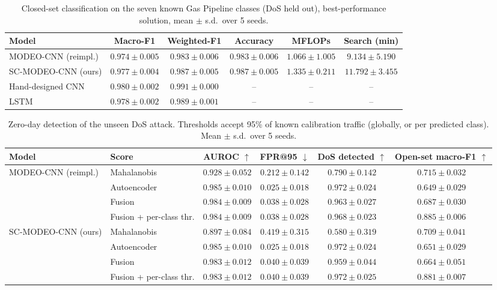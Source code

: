 \documentclass[10pt,twocolumn,letterpaper]{article}
\begin{document}
\begin{table}[t]\centering\small
\caption{Closed-set classification on the seven known Gas Pipeline classes (DoS held out), best-performance solution, mean $\pm$ s.d.\ over 5 seeds.}\label{tab:closed}
\begin{tabular}{lccccc}\toprule
Model & Macro-F1 & Weighted-F1 & Accuracy & MFLOPs & Search (min)\\\midrule
MODEO-CNN (reimpl.) & $0.974 \pm 0.005$ & $0.983 \pm 0.006$ & $0.983 \pm 0.006$ & $1.066 \pm 1.005$ & $9.134 \pm 5.190$\\
SC-MODEO-CNN (ours) & $0.977 \pm 0.004$ & $0.987 \pm 0.005$ & $0.987 \pm 0.005$ & $1.335 \pm 0.211$ & $11.792 \pm 3.455$\\
Hand-designed CNN & $0.980 \pm 0.002$ & $0.991 \pm 0.000$ & -- & -- & --\\
LSTM & $0.978 \pm 0.002$ & $0.989 \pm 0.001$ & -- & -- & --\\\bottomrule
\end{tabular}
\end{table}

\begin{table}[t]\centering\small
\caption{Zero-day detection of the unseen DoS attack. Thresholds accept 95\% of known calibration traffic (globally, or per predicted class). Mean $\pm$ s.d.\ over 5 seeds.}\label{tab:zeroday}
\begin{tabular}{llcccc}\toprule
Model & Score & AUROC $\uparrow$ & FPR@95 $\downarrow$ & DoS detected $\uparrow$ & Open-set macro-F1 $\uparrow$\\\midrule
\multirow{4}{*}{MODEO-CNN (reimpl.)} & Mahalanobis & $0.928 \pm 0.052$ & $0.212 \pm 0.142$ & $0.790 \pm 0.142$ & $0.715 \pm 0.032$\\
 & Autoencoder & $0.985 \pm 0.010$ & $0.025 \pm 0.018$ & $0.972 \pm 0.024$ & $0.649 \pm 0.029$\\
 & Fusion & $0.984 \pm 0.009$ & $0.038 \pm 0.028$ & $0.963 \pm 0.027$ & $0.687 \pm 0.030$\\
 & Fusion + per-class thr. & $0.984 \pm 0.009$ & $0.038 \pm 0.028$ & $0.968 \pm 0.023$ & $0.885 \pm 0.006$\\\midrule
\multirow{4}{*}{SC-MODEO-CNN (ours)} & Mahalanobis & $0.897 \pm 0.084$ & $0.419 \pm 0.315$ & $0.580 \pm 0.319$ & $0.709 \pm 0.041$\\
 & Autoencoder & $0.985 \pm 0.010$ & $0.025 \pm 0.018$ & $0.972 \pm 0.024$ & $0.651 \pm 0.029$\\
 & Fusion & $0.983 \pm 0.012$ & $0.040 \pm 0.039$ & $0.959 \pm 0.044$ & $0.664 \pm 0.051$\\
 & Fusion + per-class thr. & $0.983 \pm 0.012$ & $0.040 \pm 0.039$ & $0.972 \pm 0.025$ & $0.881 \pm 0.007$\\\bottomrule
\end{tabular}
\end{table}
\end{document}
